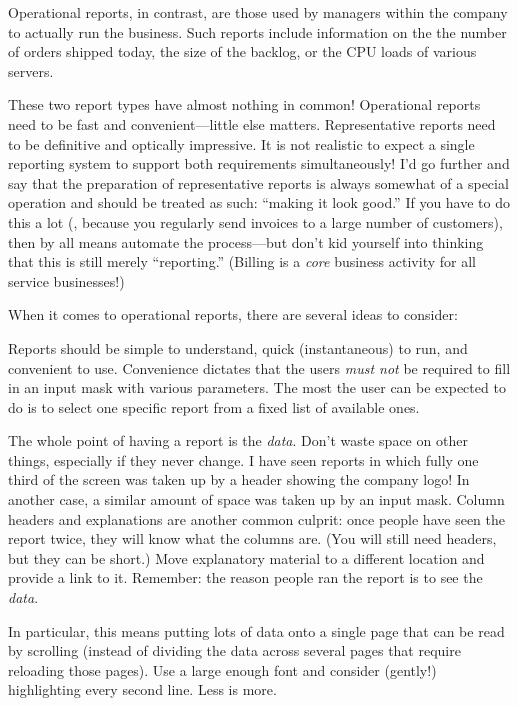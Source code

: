 Operational reports, in contrast, are those used by managers within
the company to actually run the business. Such reports include
information on the the number of orders shipped today, the size of the
backlog, or the CPU loads of various servers.

These two report types have almost nothing in common! Operational
reports need to be fast and convenient---little else matters.
Representative reports need to be definitive and optically impressive.
It is not realistic to expect a single reporting system to support
both requirements simultaneously! I'd go further and say that the
preparation of representative reports is always somewhat of a special
operation and should be treated as such: ``making it look good.'' If
you have to do this a lot (\eg, because you regularly send invoices to
a large number of customers), then by all means automate the
process---but don't kid yourself into thinking that this is still
merely ``reporting.'' (Billing is a \emph{core} business activity for
all service businesses!)

When it comes to operational reports, there are several ideas to
consider:

Reports should be simple to understand, quick (instantaneous) to run,
and convenient to use.  Convenience dictates that the users \emph{must
  not} be required to fill in an input mask with various parameters.
The most the user can be expected to do is to select one specific
report from a fixed list of available ones.


The whole point of having a report is the \emph{data}. Don't waste
space on other things, especially if they never change. I have seen
reports in which fully one third of the screen was taken up by a
header showing the company logo! In another case, a similar amount of
space was taken up by an input mask. Column headers and explanations
are another common culprit: once people have seen the report twice,
they will know what the columns are. (You will still need headers, but
they can be short.) Move explanatory material to a different location
and provide a link to it. Remember: the reason people ran the report
is to see the \emph{data}.

In particular, this means putting lots of data onto a single page that
can be read by scrolling (instead of dividing the data across several
pages that require reloading those pages).  Use a large enough font
and consider (gently!) highlighting every second line. Less is more.

